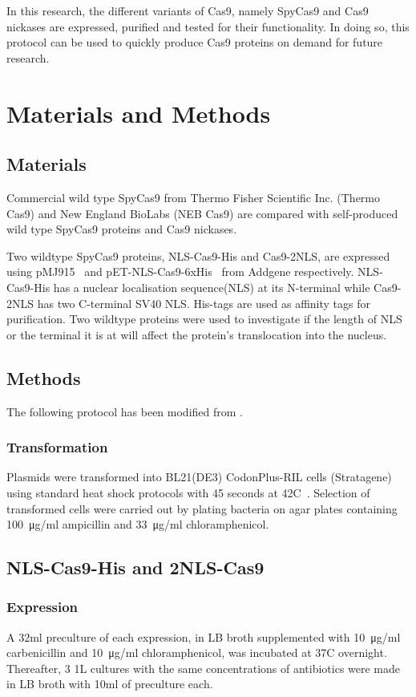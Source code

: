 \documentclass[11pt]{article}
\begin{document}
In this research, the different variants of Cas9, namely SpyCas9 and Cas9 nickases are expressed, purified and tested for their functionality. In doing so, this protocol can be used to quickly produce Cas9 proteins on demand for future research. 

\newpage
\section{Materials and Methods}
\subsection{Materials}
Commercial wild type SpyCas9 from Thermo Fisher Scientific Inc. (Thermo Cas9) and New England BioLabs (NEB Cas9) are compared with self-produced wild type SpyCas9 proteins and Cas9 nickases.

Two wildtype SpyCas9 proteins, NLS-Cas9-His and Cas9-2NLS, are expressed using pMJ915~\citep{Lin2014a} and pET-NLS-Cas9-6xHis~\citep{Zuris2014} from Addgene respectively. NLS-Cas9-His has a nuclear localisation sequence(NLS) at its N-terminal while Cas9-2NLS has two C-terminal SV40 NLS. His-tags are used as affinity tags for purification. Two wildtype proteins were used to investigate if the length of NLS or the terminal it is at will affect the protein's translocation into the nucleus. 

\subsection{Methods}
The following protocol has been modified from \cite{Jinek2012a}.

\subsubsection{Transformation}
Plasmids were transformed into BL21(DE3) CodonPlus-RIL cells (Stratagene) using standard heat shock protocols with 45 seconds at 42\degree C~\citep{Sambrook2001}. Selection of transformed cells were carried out by plating bacteria on agar plates containing \SI{100}{\micro\gram}/ml ampicillin and \SI{33}{\micro\gram}/ml chloramphenicol.

\subsection{NLS-Cas9-His and 2NLS-Cas9}

\subsubsection{Expression}
A 32ml preculture of each expression, in LB broth supplemented with \SI{10}{\micro\gram}/ml carbenicillin and \SI{10}{\micro\gram}/ml chloramphenicol, was incubated at 37\degree C overnight. Thereafter, 3 1L cultures with the same concentrations of antibiotics were made in LB broth with 10ml of preculture each. 
\end{document}
